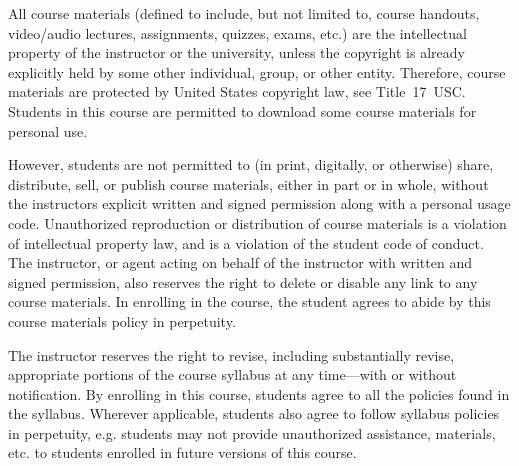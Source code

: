 \documentclass[11pt,letterpaper]{article}
\begin{document}
All course materials (defined to include, but not limited to, course handouts, video/audio lectures, assignments, quizzes, exams, etc.) are the intellectual property of the instructor or the university, unless the copyright is already explicitly held by some other individual, group, or other entity. Therefore, course materials are protected by United States copyright law, see Title~17~USC. Students in this course are permitted to download some course materials for personal use. \pspace

However, students are not permitted to (in print, digitally, or otherwise) share, distribute, sell, or publish course materials, either in part or in whole, without the instructors explicit written and signed permission along with a personal usage code. Unauthorized reproduction or distribution of course materials is a violation of intellectual property law, and is a violation of the student code of conduct. The instructor, or agent acting on behalf of the instructor with written and signed permission, also reserves the right to delete or disable any link to any course materials. In enrolling in the course, the student agrees to abide by this course materials policy in perpetuity.
\par\vspace{0.4cm}




The instructor reserves the right to revise, including substantially revise, appropriate portions of the course syllabus at any time---with or without notification. By enrolling in this course, students agree to all the policies found in the syllabus. Wherever applicable, students also agree to follow syllabus policies in perpetuity, e.g. students may not provide unauthorized assistance, materials, etc. to students enrolled in future versions of this course. 
\par\vspace{0.5cm}



\end{document}
